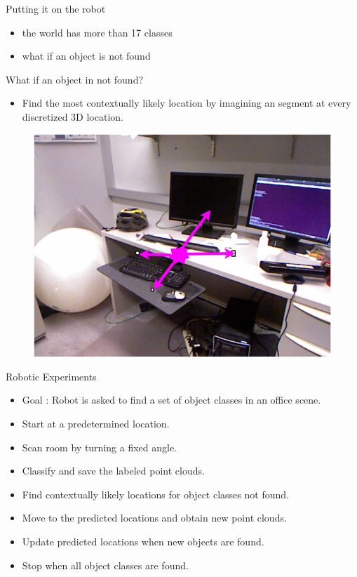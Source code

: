 \documentclass{beamer}
\begin{document}
\begin{frame}{Putting it on the robot}

\begin{itemize}
\item the world has more than 17 classes
\item what if an object is not found
\end{itemize}

\end{frame}

\begin{frame}{What if an object in not found?}
\begin{itemize}
\item Find the most contextually likely location by imagining an segment at every discretized 3D location.
\end{itemize}
 \begin{figure}   
 \includegraphics[scale=0.3]{heatImage.png} 
 \end{figure}

\end{frame}


\begin{frame}{Robotic Experiments}

\begin{itemize}
\item Goal : Robot is asked to find a set of object classes in an office scene.
\item Start at a predetermined location. 
\item Scan room by turning a fixed angle.
\item Classify and save the labeled point clouds. 
\item Find contextually likely locations for object classes not found.
\item Move to the predicted locations and obtain new point clouds.
\item Update predicted locations when new objects are found.
\item Stop when all object classes are found.

\end{itemize}

\end{frame}
\end{document}
